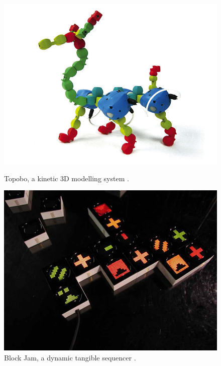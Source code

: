 \begin{figure}[h]
\centering
\begin{minipage}[t]{.45\textwidth}
  \centering
  \includegraphics[width=\linewidth]{figures/proto3/topobo}
  \caption{Topobo, a kinetic 3D modelling system \citep{raffle2004topobo}.}
  \label{topobo}
\end{minipage}%
\hspace{0.5cm}
\begin{minipage}[t]{.45\textwidth}
  \centering
  \includegraphics[width=\linewidth]{figures/proto3/blockjam}
  \caption{Block Jam, a dynamic tangible sequencer \citep{newton2003block}.}
  \label{blockjam}
\end{minipage}
\end{figure}

